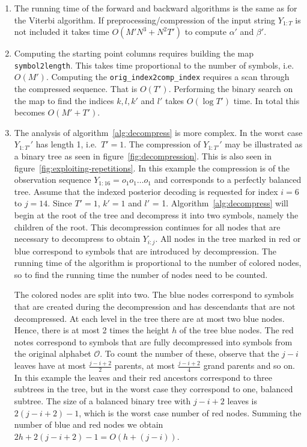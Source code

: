 \begin{enumerate}
\item The running time of the forward and backward algorithms is the same as
  for the Viterbi algorithm. If preprocessing/compression of the input string
  $Y_{1:T}$ is not included it takes time $O(M' N^3 + N^2 T')$ to compute
  $\alpha'$ and $\beta'$.

\item Computing the starting point columns requires building the map
  \texttt{symbol2length}. This takes time proportional to the number of
  symbols, i.e.\ $O(M')$. Computing the \texttt{orig\_index2comp\_index}
  requires a scan through the compressed sequence. That is $O(T')$. Performing
  the binary search on the map to find the indices $k, l, k'$ and $l'$ takes
  $O(\log T')$ time. In total this becomes $O(M' + T')$.

\item The analysis of algorithm~\ref{alg:decompress} is more complex. In the
  worst case $Y_{1:T'}'$ has length 1, i.e.\ $T' = 1$. The compression of
  $Y_{1:T'}'$ may be illustrated as a binary tree as seen in
  figure~\ref{fig:decompression}. This is also seen in
  figure~\ref{fig:exploiting-repetitions}. In this example the compression is
  of the observation sequence $Y_{1:16} = o_1o_1\dots{}o_1$ and corresponds to a
  perfectly balanced tree. Assume that the indexed posterior decoding is
  requested for index $i = 6$ to $j = 14$. Since $T' = 1$, $k' = 1$ and $l'$ =
  1. Algorithm~\ref{alg:decompress} will begin at the root of the tree and
  decompress it into two symbols, namely the children of the root. This
  decompression continues for all nodes that are necessary to decompress to
  obtain $Y_{i:j}$. All nodes in the tree marked in red or blue correspond to
  symbols that are introduced by decompression. The running time of the
  algorithm is proportional to the number of colored nodes, so to find the
  running time the number of nodes need to be counted.

  The colored nodes are split into two. The blue nodes correspond to symbols
  that are created during the decompression and has descendants that are not
  decompressed. At each level in the tree there are at most two blue nodes.
  Hence, there is at most 2 times the height $h$ of the tree blue nodes. The
  red notes correspond to symbols that are fully decompressed into symbols from
  the original alphabet $\mathcal{O}$. To count the number of these, observe
  that the $j - i$ leaves have at most $\frac{j - i + 2}{2}$ parents, at most
  $\frac{j - i + 2}{4}$ grand parents and so on. In this example the leaves and
  their red ancestors correspond to three subtrees in the tree, but in the
  worst case they correspond to one, balanced subtree. The size of a balanced
  binary tree with $j - i + 2$ leaves is $2(j - i + 2) - 1$, which is the worst
  case number of red nodes. Summing the number of blue and red nodes we obtain
  $2h + 2(j - i + 2) - 1 = O(h + (j - i))$.


\end{enumerate}
